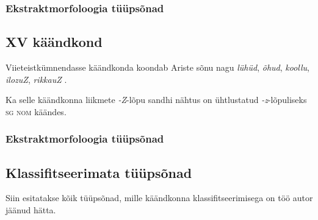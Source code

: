 \documentclass[12pt,a4paper]{article}
\newcommand{\vadja}[1]{\textit{#1}}
\newcommand{\msd}[1]{\textsc{#1}}
\begin{document}
\subsubsection*{Ekstraktmorfoloogia tüüpsõnad}
\vspace{-3.5em}



























\subsection{\RN{15} käändkond}

Viieteistkümnendasse käändkonda koondab Ariste sõnu nagu \vadja{lühüd}, \vadja{õhud}, \vadja{koollu}, \vadja{ilozuZ}, \vadja{rikkauZ} \cite[51]{ariste_grammar_1968}.

Ka selle käändkonna liikmete \vadja{-Z}-lõpu sandhi nähtus on ühtlustatud \vadja{-z}-lõpuliseks \msd{sg nom} käändes.


\subsubsection*{Ekstraktmorfoloogia tüüpsõnad}
\vspace{-3.5em}
















\subsection{Klassifitseerimata tüüpsõnad}

Siin esitatakse kõik tüüpsõnad, mille käändkonna klassifitseerimisega on töö autor jäänud hätta.
\end{document}
